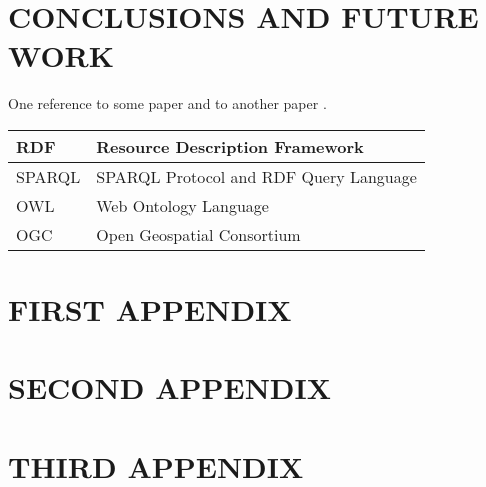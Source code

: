 \documentclass[inscr,ack,preface]{dithesis}
\begin{document}
\frontmatter

\mainmatter















\chapter{CONCLUSIONS AND FUTURE WORK}
  One reference to some paper \cite{manning:corenlp} and to another paper
  \cite{pennington:glove}.

\backmatter

\abbreviations
\begin{center}
	\renewcommand{\arraystretch}{1.5}
	\begin{longtable}{| l | @{\qquad} l |}
	\hline
	RDF    & Resource Description Framework \\
  \hline
	SPARQL & SPARQL Protocol and RDF Query Language \\
  \hline
	OWL    & Web Ontology Language \\
  \hline
	OGC    & Open Geospatial Consortium \\
	\hline
	\end{longtable}
\end{center}

\begin{appendix}
\appendixstartedtrue

{}

\chapter{FIRST APPENDIX}
\chapter{SECOND APPENDIX}
\chapter{THIRD APPENDIX}
\end{appendix}


{\footnotesize }

\end{document}
